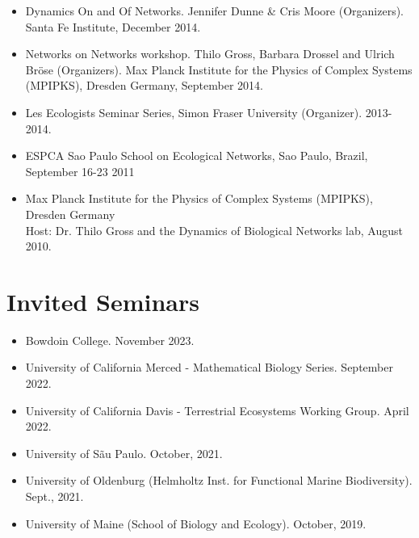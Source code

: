 \documentclass[margin,line,12pt]{res}
\begin{document}
\begin{resume}
\begin{itemize}
\item Dynamics On and Of Networks. Jennifer Dunne \& Cris Moore (Organizers). Santa Fe Institute, December 2014.

\item Networks on Networks workshop. Thilo Gross, Barbara Drossel and Ulrich Br\"ose (Organizers). Max Planck Institute for the Physics of Complex Systems (MPIPKS), Dresden Germany, September 2014.

\item Les Ecologists Seminar Series, Simon Fraser University (Organizer). 2013-2014.

\item ESPCA Sao Paulo School on Ecological Networks, Sao Paulo, Brazil, September 16-23 2011

\item Max Planck Institute for the Physics of Complex Systems (MPIPKS), Dresden Germany\\
	Host: Dr. Thilo Gross and the Dynamics of Biological Networks lab, August 2010.

\end{itemize}


\section{\sc Invited Seminars}
\begin{itemize}

\item Bowdoin College. November 2023.

\item University of California Merced - Mathematical Biology Series. September 2022.

\item University of California Davis - Terrestrial Ecosystems Working Group. April 2022.

\item University of S\~au Paulo. October, 2021.

\item University of Oldenburg (Helmholtz Inst. for Functional Marine Biodiversity). Sept., 2021.

\item University of Maine (School of Biology and Ecology). October, 2019.


\end{itemize}
\end{resume}
\end{document}
